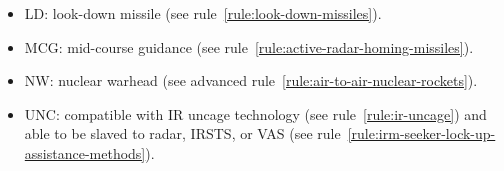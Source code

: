 \begin{landscape}
{\begin{fullwidthtable}
\begin{tablenote}{\linewidth}
\begin{itemize}[nosep]
    \item LD: look-down missile (see rule~\ref{rule:look-down-missiles}).
    \item MCG: mid-course guidance (see rule~\ref{rule:active-radar-homing-missiles}).
    \item NW: nuclear warhead (see advanced rule~\ref{rule:air-to-air-nuclear-rockets}).
    \item UNC: compatible with IR uncage technology (see rule~\ref{rule:ir-uncage}) and able to be slaved to radar, IRSTS, or VAS (see rule~\ref{rule:irm-seeker-lock-up-assistance-methods}).
\end{itemize}
\end{tablenote}
\end{fullwidthtable}
\clearpage
}
\end{landscape}
